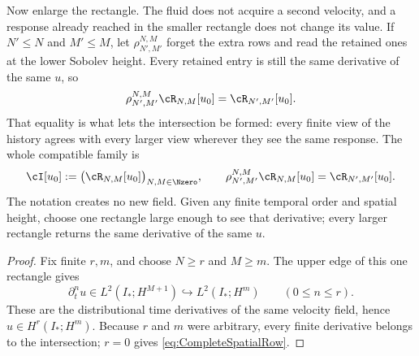 Now enlarge the rectangle.  The fluid does not acquire a second velocity, and
a response already reached in the smaller rectangle does not change its value.
If \(N'\leq N\) and \(M'\leq M\), let
\(\rho_{N',M'}^{N,M}\) forget the extra rows and read the retained ones at the
lower Sobolev height.  Every retained entry is still the same derivative of
the same \(u\), so
\begin{equation}\label{eq:BodyRectangleRestrictionCompatibility}
  \rho_{N',M'}^{N,M}\cR_{N,M}[u_0]
  =\cR_{N',M'}[u_0].
\end{equation}
That equality is what lets the intersection be formed: every finite view of
the history agrees with every larger view wherever they see the same response.
The whole compatible family is
\begin{equation}\label{eq:DatumSpecificCompatibleIntersection}
  \cI[u_0]
  :=\bigl(\cR_{N,M}[u_0]\bigr)_{N,M\in\Nzero},
  \qquad
  \rho_{N',M'}^{N,M}\cR_{N,M}[u_0]
  =\cR_{N',M'}[u_0].
\end{equation}
The notation creates no new field.  Given any finite temporal order and
spatial height, choose one rectangle large enough to see that derivative;
every larger rectangle returns the same derivative of the same \(u\).


\begin{proof}
Fix finite \(r,m\), and choose \(N\geq r\) and \(M\geq m\).
The upper edge of this one rectangle gives
\[
  \partial_t^nu\in L^2(I_*;H^{M+1})
  \hookrightarrow L^2(I_*;H^m)
  \qquad(0\leq n\leq r).
\]
These are the distributional time derivatives of the same velocity field, hence \(u\in H^r(I_*;H^m)\).
Because \(r\) and \(m\) were arbitrary, every finite derivative belongs to the intersection; \(r=0\) gives \eqref{eq:CompleteSpatialRow}.
\end{proof}
